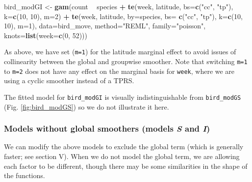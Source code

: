 \documentclass[12pt]{article}
\newenvironment{Shaded}{\begin{snugshade}}{\end{snugshade}}
\newcommand{\KeywordTok}[1]{\textcolor[rgb]{0.13,0.29,0.53}{\textbf{#1}}}
\newcommand{\DataTypeTok}[1]{\textcolor[rgb]{0.13,0.29,0.53}{#1}}
\newcommand{\DecValTok}[1]{\textcolor[rgb]{0.00,0.00,0.81}{#1}}
\newcommand{\StringTok}[1]{\textcolor[rgb]{0.31,0.60,0.02}{#1}}
\newcommand{\OperatorTok}[1]{\textcolor[rgb]{0.81,0.36,0.00}{\textbf{#1}}}
\newcommand{\NormalTok}[1]{#1}
\begin{document}
\begin{Shaded}
\begin{Highlighting}[]
\NormalTok{bird_modGI <-}\StringTok{ }\KeywordTok{gam}\NormalTok{(count }\OperatorTok{~}\StringTok{ }\NormalTok{species }\OperatorTok{+}
\StringTok{                    }\KeywordTok{te}\NormalTok{(week, latitude, }\DataTypeTok{bs=}\KeywordTok{c}\NormalTok{(}\StringTok{"cc"}\NormalTok{, }\StringTok{"tp"}\NormalTok{), }\DataTypeTok{k=}\KeywordTok{c}\NormalTok{(}\DecValTok{10}\NormalTok{, }\DecValTok{10}\NormalTok{), }\DataTypeTok{m=}\DecValTok{2}\NormalTok{) }\OperatorTok{+}
\StringTok{                    }\KeywordTok{te}\NormalTok{(week, latitude, }\DataTypeTok{by=}\NormalTok{species, }\DataTypeTok{bs=} \KeywordTok{c}\NormalTok{(}\StringTok{"cc"}\NormalTok{, }\StringTok{"tp"}\NormalTok{),}
                       \DataTypeTok{k=}\KeywordTok{c}\NormalTok{(}\DecValTok{10}\NormalTok{, }\DecValTok{10}\NormalTok{), }\DataTypeTok{m=}\DecValTok{1}\NormalTok{),}
                 \DataTypeTok{data=}\NormalTok{bird_move, }\DataTypeTok{method=}\StringTok{"REML"}\NormalTok{, }\DataTypeTok{family=}\StringTok{"poisson"}\NormalTok{,}
                 \DataTypeTok{knots=}\KeywordTok{list}\NormalTok{(}\DataTypeTok{week=}\KeywordTok{c}\NormalTok{(}\DecValTok{0}\NormalTok{, }\DecValTok{52}\NormalTok{)))}
\end{Highlighting}
\end{Shaded}

As above, we have set (\texttt{m=1}) for the latitude marginal effect to
avoid issues of collinearity between the global and groupwise smoother.
Note that switching \texttt{m=1} to \texttt{m=2} does not have any
effect on the marginal basis for \texttt{week}, where we are using a
cyclic smoother instead of a TPRS.

The fitted model for \texttt{bird\_modGI} is visually indistinguishable
from \texttt{bird\_modGS} (Fig. \ref{fig:bird_modGS}) so we do not
illustrate it here.

\subsubsection{\texorpdfstring{Models without global smoothers (models
\emph{S} and
\emph{I})}{Models without global smoothers (models S and I)}}\label{models-without-global-smoothers-models-s-and-i}

We can modify the above models to exclude the global term (which is
generally faster; see section V). When we do not model the global term,
we are allowing each factor to be different, though there may be some
similarities in the shape of the functions.
\end{document}
